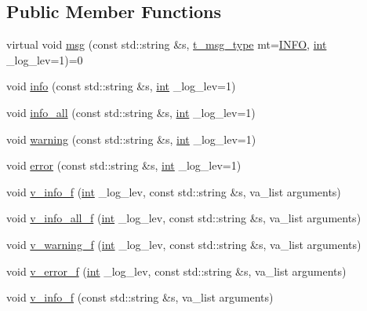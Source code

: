 \subsection*{Public Member Functions}
\begin{DoxyCompactItemize}
\item 
virtual void \hyperlink{classutils_1_1log_a29247cbe7898720893bf29947ff61c16}{msg} (const std\-::string \&s, \hyperlink{classutils_1_1log_a295e2ee43d4e5ade12dd5de546cb1983}{t\-\_\-msg\-\_\-type} mt=\hyperlink{classutils_1_1log_a295e2ee43d4e5ade12dd5de546cb1983a34a1a7830fae0bde90731e751a1ed9c0}{I\-N\-F\-O}, \hyperlink{classint}{int} \-\_\-log\-\_\-lev=1)=0
\item 
void \hyperlink{classutils_1_1log_a340f8d583ca25d4fa4aa8bbac4619779}{info} (const std\-::string \&s, \hyperlink{classint}{int} \-\_\-log\-\_\-lev=1)
\item 
void \hyperlink{classutils_1_1log_a619cda7c5f2a34f6760968307a9f1bf2}{info\-\_\-all} (const std\-::string \&s, \hyperlink{classint}{int} \-\_\-log\-\_\-lev=1)
\item 
void \hyperlink{classutils_1_1log_aabbb5fa0d3ead48cbb6fac3aff7249ca}{warning} (const std\-::string \&s, \hyperlink{classint}{int} \-\_\-log\-\_\-lev=1)
\item 
void \hyperlink{classutils_1_1log_ae74653936018ff3d4a226f66cbab10a3}{error} (const std\-::string \&s, \hyperlink{classint}{int} \-\_\-log\-\_\-lev=1)
\item 
void \hyperlink{classutils_1_1log_ac68c612eca6fd3723263ef226596da55}{v\-\_\-info\-\_\-f} (\hyperlink{classint}{int} \-\_\-log\-\_\-lev, const std\-::string \&s, va\-\_\-list arguments)
\item 
void \hyperlink{classutils_1_1log_a30221b6f6f69e9482c24b0c7a426aef0}{v\-\_\-info\-\_\-all\-\_\-f} (\hyperlink{classint}{int} \-\_\-log\-\_\-lev, const std\-::string \&s, va\-\_\-list arguments)
\item 
void \hyperlink{classutils_1_1log_ad762145ed51776aac2c492325e84fa63}{v\-\_\-warning\-\_\-f} (\hyperlink{classint}{int} \-\_\-log\-\_\-lev, const std\-::string \&s, va\-\_\-list arguments)
\item 
void \hyperlink{classutils_1_1log_ac4a667e66cb61462031fd700b3251112}{v\-\_\-error\-\_\-f} (\hyperlink{classint}{int} \-\_\-log\-\_\-lev, const std\-::string \&s, va\-\_\-list arguments)
\item 
void \hyperlink{classutils_1_1log_abdde95f78e1a816a591de7ba52b4f1ce}{v\-\_\-info\-\_\-f} (const std\-::string \&s, va\-\_\-list arguments)
\item 

\end{DoxyCompactItemize}
